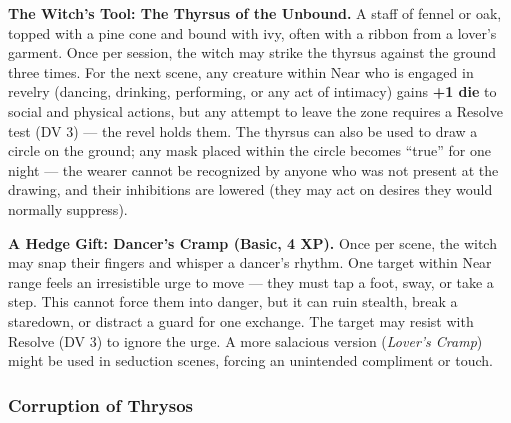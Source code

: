 \textbf{The Witch's Tool: The Thyrsus of the Unbound.} A staff of fennel or oak, topped with a pine cone and bound with ivy, often with a ribbon from a lover's garment. Once per session, the witch may strike the thyrsus against the ground three times. For the next scene, any creature within Near who is engaged in revelry (dancing, drinking, performing, or any act of intimacy) gains \textbf{+1 die} to social and physical actions, but any attempt to leave the zone requires a Resolve test (DV 3) --- the revel holds them. The thyrsus can also be used to draw a circle on the ground; any mask placed within the circle becomes ``true'' for one night --- the wearer cannot be recognized by anyone who was not present at the drawing, and their inhibitions are lowered (they may act on desires they would normally suppress).

\textbf{A Hedge Gift: Dancer's Cramp (Basic, 4 XP).} Once per scene, the witch may snap their fingers and whisper a dancer's rhythm. One target within Near range feels an irresistible urge to move --- they must tap a foot, sway, or take a step. This cannot force them into danger, but it can ruin stealth, break a staredown, or distract a guard for one exchange. The target may resist with Resolve (DV 3) to ignore the urge. A more salacious version (\textit{Lover's Cramp}) might be used in seduction scenes, forcing an unintended compliment or touch.

\subsubsection*{Corruption of Thrysos}

